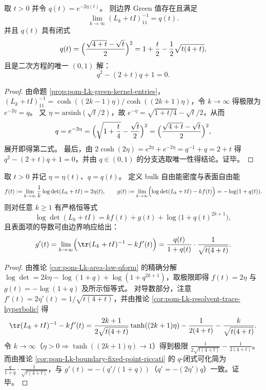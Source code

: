 \begin{corollary}\label{cor:pom-Lk-boundary-fixed-point-riccati}
取 \(t>0\) 并令 \(q(t)=e^{-2\eta(t)}\)。
则边界 Green 值存在且满足
\[
\lim_{k\to\infty}(L_k+tI)^{-1}_{11}=q(t).
\]
并且 \(q(t)\) 具有闭式
\[
q(t)=\Bigl(\frac{\sqrt{4+t}-\sqrt{t}}{2}\Bigr)^{2}
=1+\frac{t}{2}-\frac{1}{2}\sqrt{t(4+t)},
\]
且是二次方程的唯一 \((0,1)\) 解：
\[
q^2-(2+t)q+1=0.
\]
\end{corollary}
\begin{proof}
由命题 \ref{prop:pom-Lk-green-kernel-entries}，\((L_k+tI)^{-1}_{11}=\cosh((2k-1)\eta)/\cosh((2k+1)\eta)\)，令 \(k\to\infty\) 得极限为 \(e^{-2\eta}=q\)。
又 \(\eta=\mathrm{arsinh}(\sqrt{t}/2)\)，故 \(e^{-\eta}=\sqrt{1+t/4}-\sqrt{t}/2\)，从而
\[
q=e^{-2\eta}=\Bigl(\sqrt{1+\frac{t}{4}}-\frac{\sqrt{t}}{2}\Bigr)^2
=\Bigl(\frac{\sqrt{4+t}-\sqrt{t}}{2}\Bigr)^2,
\]
展开即得第二式。
最后，由 \(2\cosh(2\eta)=e^{2\eta}+e^{-2\eta}=q^{-1}+q=2+t\) 得 \(q^2-(2+t)q+1=0\)，并由 \(q\in(0,1)\) 的分支选取唯一性得结论。证毕。
\end{proof}

\begin{corollary}\label{cor:pom-Lk-surface-free-energy}
取 \(t>0\) 并记 \(\eta=\eta(t)\)、\(q=q(t)\)。
定义 bulk 自由能密度与表面自由能
\[
f(t):=\lim_{k\to\infty}\frac{1}{k}\log\det(L_k+tI)=2\eta(t),
\qquad
g(t):=\lim_{k\to\infty}\Bigl(\log\det(L_k+tI)-k f(t)\Bigr)=-\log(1+q(t)).
\]
则对任意 \(k\ge 1\) 有严格恒等式
\[
\log\det(L_k+tI)=k f(t)+g(t)+\log\bigl(1+q(t)^{2k+1}\bigr),
\]
且表面项的导数可由边界响应给出：
\[
g'(t)=\lim_{k\to\infty}\Bigl(\tr(L_k+tI)^{-1}-k f'(t)\Bigr)
=\frac{q(t)}{1+q(t)}\cdot \frac{1}{\sqrt{t(4+t)}}.
\]
\end{corollary}
\begin{proof}
由推论 \ref{cor:pom-Lk-area-law-qform} 的精确分解
\(
\log\det=2k\eta-\log(1+q)+\log(1+q^{2k+1})
\)，取极限即得 \(f(t)=2\eta\) 与 \(g(t)=-\log(1+q)\) 及所示恒等式。
对导数部分，注意 \(f'(t)=2\eta'(t)=1/\sqrt{t(4+t)}\)，并由推论 \ref{cor:pom-Lk-resolvent-trace-hyperbolic} 得
\[
\tr(L_k+tI)^{-1}-k f'(t)
=\frac{2k+1}{2\sqrt{t(4+t)}}\tanh((2k+1)\eta)-\frac{1}{2(4+t)}-\frac{k}{\sqrt{t(4+t)}}.
\]
令 \(k\to\infty\)（\(\eta>0\Rightarrow\tanh((2k+1)\eta)\to 1\)）得到极限
\(
\frac{1}{2\sqrt{t(4+t)}}-\frac{1}{2(4+t)}
\)。
而由推论 \ref{cor:pom-Lk-boundary-fixed-point-riccati} 的 \(q\)-闭式可化简为
\(
\frac{q}{1+q}\cdot \frac{1}{\sqrt{t(4+t)}}
\)，与 \(g'(t)=-(q'/(1+q))\)（\(q'=-(2\eta')q\)）一致。证毕。
\end{proof}


